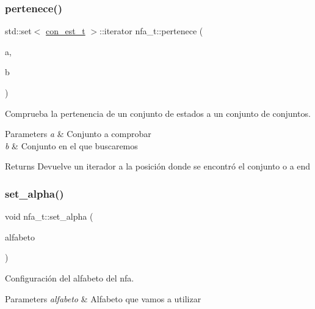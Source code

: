 \subsubsection{\texorpdfstring{pertenece()}{pertenece()}}
{\footnotesize\ttfamily std\+::set$<$ \hyperlink{classcon__est__t}{con\+\_\+est\+\_\+t} $>$\+::iterator nfa\+\_\+t\+::pertenece (\begin{DoxyParamCaption}\item[{const \hyperlink{classcon__est__t}{con\+\_\+est\+\_\+t} \&}]{a,  }\item[{const std\+::set$<$ \hyperlink{classcon__est__t}{con\+\_\+est\+\_\+t} $>$ \&}]{b }\end{DoxyParamCaption})}



Comprueba la pertenencia de un conjunto de estados a un conjunto de conjuntos. 


\begin{DoxyParams}{Parameters}
{\em a} & Conjunto a comprobar \\
\hline
{\em b} & Conjunto en el que buscaremos \\
\hline
\end{DoxyParams}
\begin{DoxyReturn}{Returns}
Devuelve un iterador a la posición donde se encontró el conjunto o a end 
\end{DoxyReturn}
\mbox{\label{classnfa__t_aaaab7f2809d9630a00059b36f7e505cc}} 
\subsubsection{\texorpdfstring{set\+\_\+alpha()}{set\_alpha()}}
{\footnotesize\ttfamily void nfa\+\_\+t\+::set\+\_\+alpha (\begin{DoxyParamCaption}\item[{const \hyperlink{classalfabeto__t}{alfabeto\+\_\+t} \&}]{alfabeto }\end{DoxyParamCaption})\hspace{0.3cm}{\ttfamily [inline]}}



Configuración del alfabeto del nfa. 


\begin{DoxyParams}{Parameters}
{\em alfabeto} & Alfabeto que vamos a utilizar \\
\hline
\end{DoxyParams}
\mbox{\label{classnfa__t_acc1c6598fd71f807abeaddcfbe2cd06b}} 
